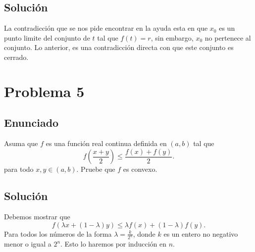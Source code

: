 \documentclass{report}
\begin{document}
\section{Solución}

La contradicción que se nos pide encontrar en la ayuda esta en que $x_0$ es un punto limite del conjunto de $t$ tal que $f\left( t \right) = r$, sin embargo, $x_0$ no pertenece al conjunto. Lo anterior, es una contradicción directa con que este conjunto es cerrado.

\chapter{Problema 5}
\section{Enunciado}

Asuma que $f$ es una función real continua definida en $\left( a, b \right) $ tal que \[
f\left( \frac{x + y}{2} \right) \le \frac{f(x) + f(y)}{2}
.\] para todo $x, y \in \left( a,b \right) $. Pruebe que $f$ es convexo.

\section{Solución}

Debemos mostrar que  \[
f\left( \lambda x + \left( 1 - \lambda \right) y \right) \le \lambda f\left( x \right) + \left( 1 - \lambda \right) f\left( y \right) 
.\] Para todos los números de la forma $\lambda = \frac{k}{2^{n}}$, donde $k$ es un entero no negativo menor o igual a $2^{n}$. Esto lo haremos por inducción en $n$.
\end{document}

